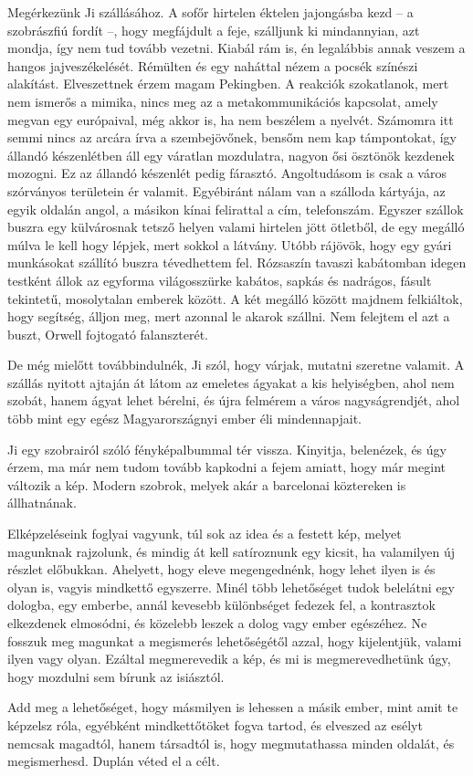 Megérkezünk Ji szállásához. A sofőr hirtelen éktelen jajongásba kezd
-- a szobrászfiú fordít --, hogy megfájdult a feje, szálljunk ki
mindannyian, azt mondja, így nem tud tovább vezetni. Kiabál rám is,
én legalábbis annak veszem a hangos jajveszékelését. Rémülten és egy
naháttal nézem a pocsék színészi alakítást. Elveszettnek érzem magam
Pekingben. A reakciók szokatlanok, mert nem ismerős a mimika, nincs
meg az a metakommunikációs kapcsolat, amely megvan egy európaival,
még akkor is, ha nem beszélem a nyelvét. Számomra itt semmi nincs az
arcára írva a szembejövőnek, bensőm nem kap támpontokat, így állandó
készenlétben áll egy váratlan mozdulatra, nagyon ősi ösztönök kezdenek
mozogni. Ez az állandó készenlét pedig fárasztó. Angoltudásom
is csak a város szórványos területein ér valamit. Egyébiránt nálam van
a szálloda kártyája, az egyik oldalán angol, a másikon kínai felirattal a
cím, telefonszám. Egyszer szállok buszra egy külvárosnak tetsző helyen
valami hirtelen jött ötletből, de egy megálló múlva le kell hogy lépjek,
mert sokkol a látvány. Utóbb rájövök, hogy egy gyári munkásokat
szállító buszra tévedhettem fel. Rózsaszín tavaszi kabátomban idegen
testként állok az egyforma világosszürke kabátos, sapkás és nadrágos,
fásult tekintetű, mosolytalan emberek között. A két megálló között
majdnem felkiáltok, hogy segítség, álljon meg, mert azonnal le akarok
szállni. Nem felejtem el azt a buszt, Orwell fojtogató falanszterét.

De még mielőtt továbbindulnék, Ji szól, hogy várjak, mutatni szeretne
valamit. A szállás nyitott ajtaján át látom az emeletes ágyakat a
kis helyiségben, ahol nem szobát, hanem ágyat lehet bérelni, és újra
felmérem a város nagyságrendjét, ahol több mint egy egész Magyarországnyi
ember éli mindennapjait.

Ji egy szobrairól szóló fényképalbummal tér vissza. Kinyitja, belenézek,
és úgy érzem, ma már nem tudom tovább kapkodni a fejem
amiatt, hogy már megint változik a kép. Modern szobrok, melyek akár
a barcelonai köztereken is állhatnának.

\bigskip
\begin{itshape}
Elképzeléseink foglyai vagyunk, túl sok az idea és a festett kép, melyet
magunknak rajzolunk, és mindig át kell satíroznunk egy kicsit, ha valamilyen
új részlet előbukkan. Ahelyett, hogy eleve megengednénk, hogy lehet
ilyen is és olyan is, vagyis mindkettő egyszerre. Minél több lehetőséget
tudok belelátni egy dologba, egy emberbe, annál kevesebb különbséget fedezek
fel, a kontrasztok elkezdenek elmosódni, és közelebb leszek a dolog vagy
ember egészéhez. Ne fosszuk meg magunkat a megismerés lehetőségétől azzal,
hogy kijelentjük, valami ilyen vagy olyan. Ezáltal megmerevedik a kép,
és mi is megmerevedhetünk úgy, hogy mozdulni sem bírunk az isiásztól.

Add meg a lehetőséget, hogy másmilyen is lehessen a másik ember, mint
amit te képzelsz róla, egyébként mindkettőtöket fogva tartod, és elveszed az
esélyt nemcsak magadtól, hanem társadtól is, hogy megmutathassa minden
oldalát, és megismerhesd. Duplán véted el a célt.
\end{itshape}


